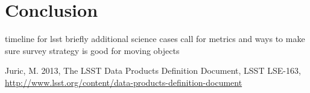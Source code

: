 \documentclass{iau}
\begin{document}
\section{Conclusion}
timeline for lsst
briefly additional science cases
call for metrics and ways to make sure survey strategy is good for
moving objects



\begin{thebibliography}{}

{Juric, M.} 2013, The LSST Data Products Definition Document, LSST LSE-163,
\url{http://www.lsst.org/content/data-products-definition-document}

\end{thebibliography}

\end{document}
